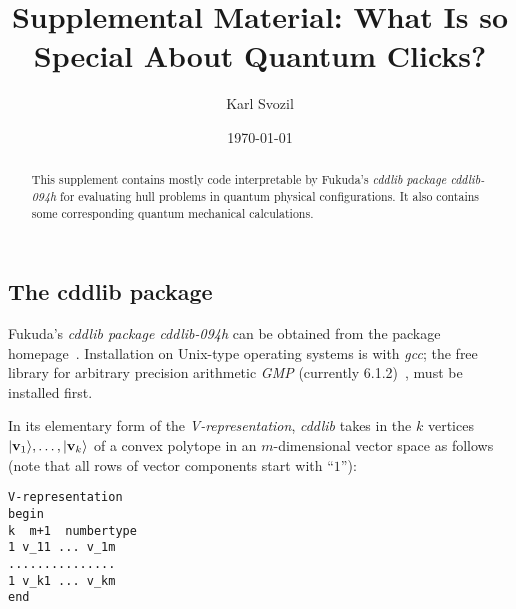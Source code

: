 \documentclass[%
 showpacs,
 showkeys,
 preprintnumbers,
 amsmath,amssymb,
 aps,
  pra,
  longbibliography,
 floatfix,
 ]{revtex4-1}
\begin{document}
\title{Supplemental Material: What Is so Special About Quantum Clicks?}


\author{Karl Svozil}




\date{\today}

\begin{abstract}
This supplement contains mostly code interpretable by Fukuda's {\em cddlib package cddlib-094h} for evaluating hull problems in quantum physical configurations. It also contains some corresponding quantum mechanical calculations.
\end{abstract}

\maketitle



\tableofcontents


\subsection{The cddlib package}





Fukuda's {\em cddlib package cddlib-094h} can be obtained from the package homepage~\cite{cdd-pck}. Installation on Unix-type operating systems is with {\em gcc};
the free library for arbitrary precision arithmetic {\em GMP} (currently 6.1.2)~\cite{gmplib}, must be installed first.

In its elementary form of the  {\em V-representation},  {\em cddlib}
takes in the $k$ vertices $\vert {\bf v}_1 \rangle , \ldots , \vert {\bf v}_k \rangle$ of a convex polytope in an $m$-dimensional
vector space as follows (note that all rows of vector components start with ``$1$''):

\begin{lstlisting}[backgroundcolor=\color{yellow!10},framerule=0pt,breaklines=true, frame=tb]
V-representation
begin
k  m+1  numbertype
1 v_11 ... v_1m
...............
1 v_k1 ... v_km
end
\end{lstlisting}
\end{document}
